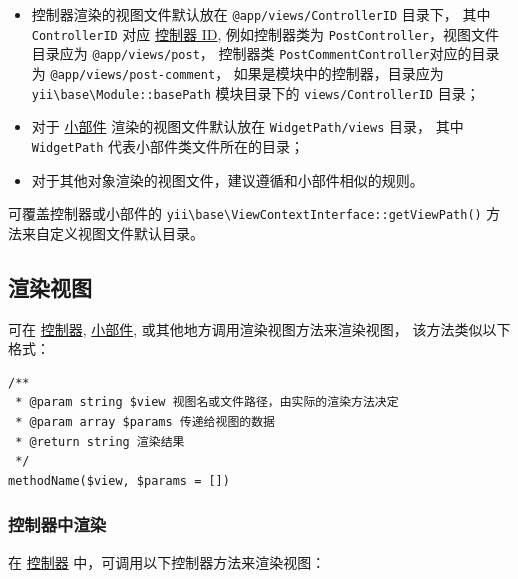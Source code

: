 \begin{itemize}
\item 控制器渲染的视图文件默认放在 \lstinline|@app/views/ControllerID| 目录下，
其中 \lstinline|ControllerID| 对应 \hyperref[structure-controllers.md::routes]{控制器 ID},
例如控制器类为 \lstinline|PostController|，视图文件目录应为 \lstinline|@app/views/post|，
控制器类 \lstinline|PostCommentController|对应的目录为 \lstinline|@app/views/post-comment|，
如果是模块中的控制器，目录应为 \texttt{yii{\allowbreak{}\textbackslash}base{\allowbreak{}\textbackslash}Module\allowbreak{}::\allowbreak{}basePath} 模块目录下的 \lstinline|views/ControllerID| 目录；
\item 对于 \hyperref[structure-widgets.md]{小部件} 渲染的视图文件默认放在 \lstinline|WidgetPath/views| 目录，
其中 \lstinline|WidgetPath| 代表小部件类文件所在的目录；
\item 对于其他对象渲染的视图文件，建议遵循和小部件相似的规则。
\end{itemize}
可覆盖控制器或小部件的 \texttt{yii{\allowbreak{}\textbackslash}base{\allowbreak{}\textbackslash}ViewContextInterface\allowbreak{}::\allowbreak{}getViewPath()} 方法来自定义视图文件默认目录。

\subsection{渲染视图 \label{structure-views.md::rendering-views}}
可在 \hyperref[structure-controllers.md]{控制器}, \hyperref[structure-widgets.md]{小部件}, 或其他地方调用渲染视图方法来渲染视图，
该方法类似以下格式：

\begin{lstlisting}
/**
 * @param string $view 视图名或文件路径，由实际的渲染方法决定
 * @param array $params 传递给视图的数据
 * @return string 渲染结果
 */
methodName($view, $params = [])
\end{lstlisting}
\subsubsection{控制器中渲染 \label{structure-views.md::rendering-in-controllers}}
在 \hyperref[structure-controllers.md]{控制器} 中，可调用以下控制器方法来渲染视图：

